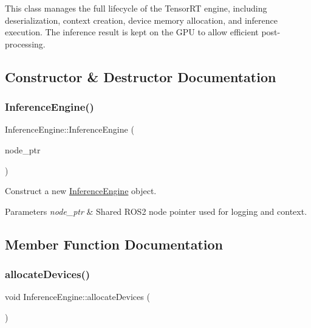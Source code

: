 This class manages the full lifecycle of the Tensor\+RT engine, including deserialization, context creation, device memory allocation, and inference execution. The inference result is kept on the G\+PU to allow efficient post-\/processing. 

\subsection{Constructor \& Destructor Documentation}
\mbox{\label{classInferenceEngine_a78f278f19b88965dd3bdfb24f5fa1d55}} 
\subsubsection{\texorpdfstring{Inference\+Engine()}{InferenceEngine()}}
{\footnotesize\ttfamily Inference\+Engine\+::\+Inference\+Engine (\begin{DoxyParamCaption}\item[{std\+::shared\+\_\+ptr$<$ rclcpp\+::\+Node $>$}]{node\+\_\+ptr }\end{DoxyParamCaption})}



Construct a new \hyperlink{classInferenceEngine}{Inference\+Engine} object. 


\begin{DoxyParams}{Parameters}
{\em node\+\_\+ptr} & Shared R\+O\+S2 node pointer used for logging and context. \\
\hline
\end{DoxyParams}


\subsection{Member Function Documentation}
\mbox{\label{classInferenceEngine_a3937cf84f22d0652cd5fe734d9b92290}} 
\subsubsection{\texorpdfstring{allocate\+Devices()}{allocateDevices()}}
{\footnotesize\ttfamily void Inference\+Engine\+::allocate\+Devices (\begin{DoxyParamCaption}{ }\end{DoxyParamCaption})\hspace{0.3cm}{\ttfamily [private]}}



